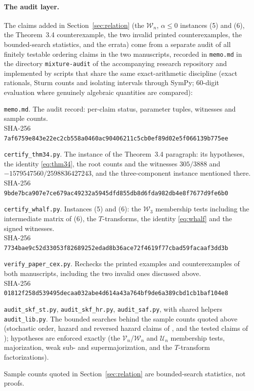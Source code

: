 \documentclass[10pt]{article}
\theoremstyle{plain}
\theoremstyle{definition}
\theoremstyle{remark}
\begin{document}
\paragraph{The audit layer.} The claims added in Section~\ref{sec:relation} (the $\mathcal W_n$, $\alpha\le0$ instances (5) and (6), the Theorem~3.4 counterexample, the two invalid printed counterexamples, the bounded-search statistics, and the \cite{ShojaeeAsadiFinkelstein2022} errata) come from a separate audit of all finitely testable ordering claims in the two manuscripts, recorded in \texttt{memo.md} in the directory \texttt{mixture-audit} of the accompanying research repository and implemented by scripts that share the same exact-arithmetic discipline (exact rationals, Sturm counts and isolating intervals through SymPy; $60$-digit evaluation where genuinely algebraic quantities are compared):
\begin{list}{}{\setlength{\leftmargin}{1em}\setlength{\itemsep}{2pt}\small}
\item \texttt{memo.md}. The audit record: per-claim status, parameter tuples, witnesses and sample counts.\\
SHA-256 \texttt{7af6759e843e22ec2cb558a0460ac90406211c5cb0ef89d02e5f066139b775ee}
\item \texttt{certify\_thm34.py}. The instance of the Theorem~3.4 paragraph: its hypotheses, the identity \eqref{eq:thm34}, the root counts and the witnesses $305/3888$ and $-1579547560/2598836427243$, and the three-component instance mentioned there.\\
SHA-256 \texttt{9bde7bca907e7ce679ac49232a5945dfd855db8d6fda982db4e8f7677d9fe6b0}
\item \texttt{certify\_whalf.py}. Instances (5) and (6): the $\mathcal W_3$ membership tests including the intermediate matrix of (6), the $T$-transforms, the identity \eqref{eq:whalf} and the signed witnesses.\\
SHA-256 \texttt{7734bae9c52d33053f82689252edad8b36ace72f4619f77cbad59facaaf3dd3b}
\item \texttt{verify\_paper\_cex.py}. Rechecks the printed examples and counterexamples of both manuscripts, including the two invalid ones discussed above.\\
SHA-256 \texttt{01812f258d539495decaa032abe4d614a43a764bf9de6a389cbd1cb1baf104e8}
\item \texttt{audit\_skf\_st.py}, \texttt{audit\_skf\_hr.py}, \texttt{audit\_saf.py}, with shared helpers \texttt{audit\_lib.py}. The bounded searches behind the sample counts quoted above (stochastic order, hazard and reversed hazard claims of \cite{SahooKayalFinkelstein2026}, and the tested claims of \cite{ShojaeeAsadiFinkelstein2022}); hypotheses are enforced exactly (the $\mathcal V_n$/$\mathcal W_n$ and $\mathcal U_n$ membership tests, majorization, weak sub- and supermajorization, and the $T$-transform factorizations).
\end{list}
Sample counts quoted in Section~\ref{sec:relation} are bounded-search statistics, not proofs.

\setlength{\bibsep}{1pt plus 0.3ex}
{\small


}
\end{document}
